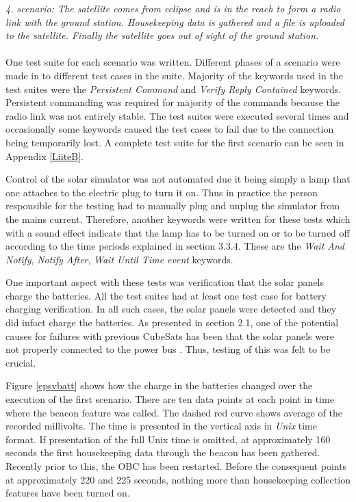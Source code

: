 \documentclass[english,12pt,a4paper,pdftex,elec,utf8]{aaltothesis}
\begin{document}
\textit{4. scenario: The satellite comes from eclipse and is in the reach to form a radio link with the ground station. Housekeeping data is gathered and a file is uploaded to the satellite. Finally the satellite goes out of sight of the ground station.}\\
\\
One test suite for each scenario was written. Different phases of a scenario were made in to different test cases in the suite. Majority of the keywords used in the test suites were the \textit{Persistent Command} and \textit{Verify Reply Contained} keywords. Persistent commanding was required for majority of the commands because the radio link was not entirely stable. The test suites were executed several times and occasionally some keywords caused the test cases to fail due to the connection being temporarily lost. A complete test suite for the first scenario can be seen in Appendix \ref{LiiteB}.\par
Control of the solar simulator was not automated due it being simply a lamp that one attaches to the electric plug to turn it on. Thus in practice the person responsible for the testing had to manually plug and unplug the simulator from the mains current. Therefore, another keywords were written for these tests which with a sound effect indicate that the lamp has to be turned on or to be turned off according to the time periods explained in section 3.3.4. These are the \textit{Wait And Notify}, \textit{Notify After}, \textit{Wait Until Time event} keywords.\par
One important aspect with these tests was verification that the solar panels charge the batteries. All the test suites had at least one test case for battery charging verification. In all such cases, the solar panels were detected and they did infact charge the batteries. As presented in section 2.1, one of the potential causes for failures with previous CubeSats has been that the solar panels were not properly connected to the power bus \cite{Swart1}. Thus, testing of this was felt to be crucial.\par 
Figure \ref{epsvbatt} shows how the charge in the batteries changed over the execution of the first scenario. There are ten data points at each point in time where the beacon feature was called. The dashed red curve shows average of the recorded millivolts. The time is presented in the vertical axis in \textit{Unix} time format. If presentation of the full Unix time is omitted, at approximately 160 seconds the first housekeeping data through the beacon has been gathered. Recently prior to this, the OBC has been restarted. Before the consequent points at approximately 220 and 225 seconds, nothing more than housekeeping collection features have been turned on.\par
\end{document}
